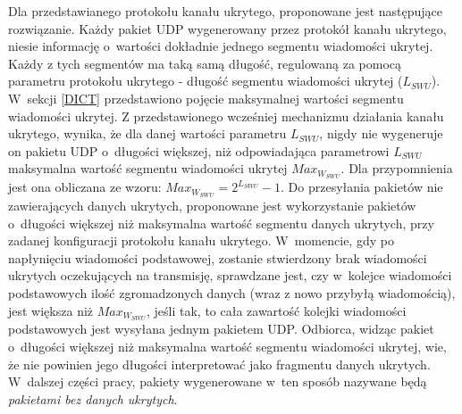 \documentclass[a4paper, twoside, 12pt]{report}
\begin{document}
    Dla przedstawianego protokołu kanału ukrytego, proponowane jest następujące
    rozwiązanie. Każdy pakiet UDP wygenerowany przez protokół kanału ukrytego,
    niesie informację o~wartości dokładnie jednego segmentu wiadomości ukrytej.
    Każdy z tych segmentów ma taką samą długość, regulowaną za pomocą parametru
    protokołu ukrytego - długość segmentu wiadomości ukrytej (\( L_{SWU} \)). W~sekcji \ref{DICT}
    przedstawiono pojęcie maksymalnej wartości segmentu wiadomości ukrytej.
    Z przedstawionego wcześniej mechanizmu
    działania kanału ukrytego, wynika, że dla danej wartości parametru \( L_{SWU} \),
    nigdy nie wygeneruje on pakietu UDP o~długości większej, niż odpowiadająca parametrowi
    \( L_{SWU} \) maksymalna wartość segmentu wiadomości ukrytej \( Max_{W_{SWU}} \).
    Dla przypomnienia jest ona obliczana ze wzoru:
    \begin{math}
        Max_{W_{SWU}} = 2^{L_{SWU}} - 1
    \end{math}.
    Do przesyłania pakietów nie zawierających danych ukrytych, proponowane jest
    wykorzystanie pakietów o~długości większej niż maksymalna wartość segmentu
    danych ukrytych, przy zadanej konfiguracji protokołu kanału ukrytego. W~momencie,
    gdy po napłynięciu wiadomości podstawowej, zostanie stwierdzony brak wiadomości
    ukrytych oczekujących na transmisję, sprawdzane jest, czy w~kolejce wiadomości
    podstawowych ilość zgromadzonych danych (wraz z nowo przybyłą wiadomością), jest
    większa niż \( Max_{W_{SWU}} \), jeśli tak, to cała zawartość kolejki wiadomości
    podstawowych jest wysyłana jednym pakietem UDP. Odbiorca, widząc pakiet o~długości
    większej niż maksymalna wartość segmentu wiadomości ukrytej, wie, że nie powinien
    jego długości interpretować jako fragmentu danych ukrytych. W~dalszej części
    pracy, pakiety wygenerowane w~ten sposób nazywane będą \emph{pakietami bez danych ukrytych}.
\end{document}
